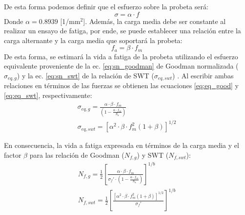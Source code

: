 De esta forma podemos definir que el esfuerzo sobre la probeta será:
\begin{equation}
	\sigma = \alpha \cdot f
\end{equation}
Donde $\alpha = 0.8939$ [1/mm$^2$]. Además, la carga media debe ser constante al realizar un ensayo de fatiga, por ende, se puede establecer una relación entre la carga alternante y la carga media que soportará la probeta:
\begin{equation} \label{eq:fa_bfm}
	f_a = \beta \cdot f_m
\end{equation}
De esta forma, se estimará la vida a fatiga de la probeta utilizando el esfuerzo equivalente proveniente de la ec. \ref{eq:sn_goodman} de Goodman normalizada ($\sigma_{eq,g}$) y la ec. \ref{eq:sn_swt} de la relación de SWT ($\sigma_{eq,swt}$) . Al escribir ambas relaciones en términos de las fuerzas se obtienen las ecuaciones \ref{eq:eq_good} y \ref{eq:eq_swt}, respectivamente:
\begin{subequations}
\begin{gather}
	\sigma_{eq,g} = \frac{\alpha \cdot \beta \cdot f_m}{\left(1 - \frac{\alpha \cdot f_m}{S_u}\right)} \label{eq:eq_good} \\[10pt]
	\sigma_{eq,swt} = \left[ \alpha^2 \cdot \beta \cdot f_m^2 (1 + \beta)\right]^{1/2} \label{eq:eq_swt}
\end{gather}
\end{subequations}

%
 
En consecuencia, la vida a fatiga expresada en términos de la carga media y el factor $\beta$ para las relación de Goodman ($N_{f,g}$) y SWT ($N_{f,swt}$):
\begin{subequations}
\begin{gather}
	N_{f,g} = \frac{1}{2} \left[\frac{\alpha \cdot \beta \cdot f_m}{\sigma_f' \cdot \left(1 - \frac{\alpha \cdot f_m}{S_u}\right)}\right]^{1/b} \\[10pt]
	N_{f,swt} = \frac{1}{2}\left[\frac{\left[ \alpha^2 \cdot \beta \cdot f_m^2 (1 + \beta)\right]^{1/2}}{\sigma_f'}\right]^{1/b}
\end{gather}
\end{subequations}

